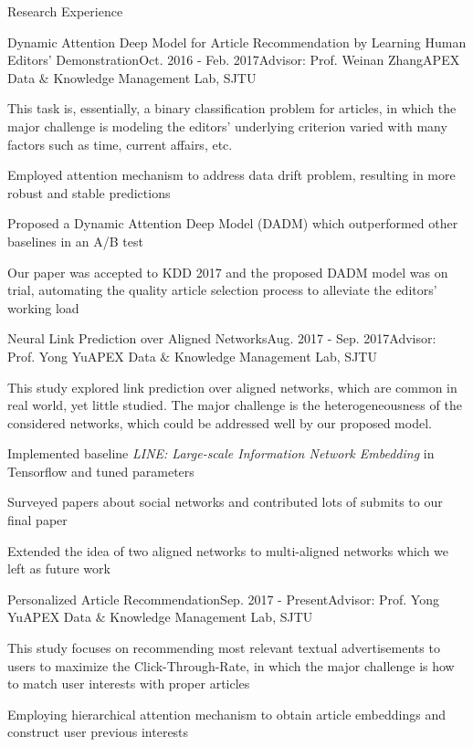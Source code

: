 \documentclass{resume} %
\begin{document}
\begin{rSection}{Research Experience}

\begin{rSubsection}{Dynamic Attention Deep Model for Article Recommendation
by Learning Human Editors’ Demonstration}{Oct. 2016 - Feb. 2017}{Advisor: Prof. Weinan Zhang}{APEX Data $\&$ Knowledge Management Lab, SJTU}  
\vspace{-3pt}
\item This task is, essentially, a binary classification problem for articles, in which the major challenge is modeling the editors' underlying criterion varied with many factors such as time, current affairs, etc.
\item Employed attention mechanism to address data drift problem, resulting in more robust and stable predictions
\item Proposed a Dynamic Attention Deep Model (DADM) which outperformed other baselines in an A/B test
\item Our paper was accepted to KDD 2017 and the proposed DADM model was on trial, automating the quality article selection process to alleviate the editors' working load
\end{rSubsection}

\begin{rSubsection}{Neural Link Prediction over Aligned Networks}{Aug. 2017 - Sep. 2017}{Advisor: Prof. Yong Yu}{APEX Data $\&$ Knowledge Management Lab, SJTU}
\item This study explored link prediction over aligned networks, which are common in real world, yet little studied. The major challenge is the heterogeneousness of the considered networks, which could be addressed well by our proposed model.
\item Implemented baseline \emph{LINE: Large-scale Information Network Embedding} in Tensorflow and tuned parameters
\item Surveyed papers about social networks and contributed lots of submits to our final paper
\item Extended the idea of two aligned networks to multi-aligned networks which we left as future work
\end{rSubsection}

\begin{rSubsection}{Personalized Article Recommendation}{Sep. 2017 - Present}{Advisor: Prof. Yong Yu}{APEX Data $\&$ Knowledge Management Lab, SJTU}
\item This study focuses on recommending most relevant textual advertisements to users to maximize the Click-Through-Rate, in which the major challenge is how to match user interests with proper articles
\item Employing hierarchical attention mechanism to obtain article embeddings and construct user previous interests
\end{rSubsection}

\end{rSection}
\end{document}
